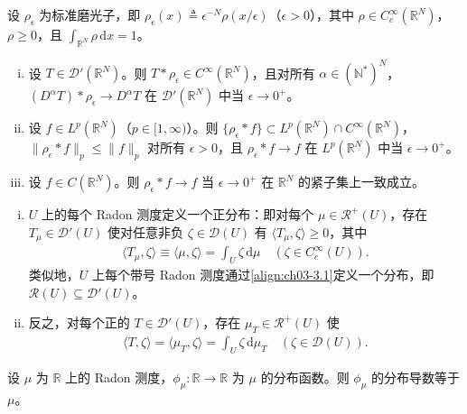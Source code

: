 \documentclass[../../main.tex]{subfiles}%
\begin{document}
设 $\rho_\epsilon$ 为标准磨光子，即 $\rho_\epsilon(x)\triangleq \epsilon^{-N}\rho(x/\epsilon)$（$\epsilon>0$），其中 $\rho\in C^\infty_c(\mathbb{R}^N)$，$\rho\geqslant0$，且 $\int_{\mathbb{R}^N}\rho\,\mathrm{d}x=1$。

\begin{proposition}\label{proposition:ch03-磨光逼近}\label{proposition:ch03-磨光性质}
\begin{enumerate}[(i)]
\item 设 $T\in\mathcal{D}'(\mathbb{R}^N)$。则 $T*\rho_\epsilon\in C^\infty(\mathbb{R}^N)$，且对所有 $\alpha\in(\mathbb{N}^*)^N$，$(D^\alpha T)*\rho_\epsilon\to D^\alpha T$ 在 $\mathcal{D}'(\mathbb{R}^N)$ 中当 $\epsilon\to0^+$。
\item 设 $f\in L^p(\mathbb{R}^N)$（$p\in[1,\infty)$）。则 $\{\rho_\epsilon*f\}\subset L^p(\mathbb{R}^N)\cap C^\infty(\mathbb{R}^N)$，$\|\rho_\epsilon*f\|_p\leqslant\|f\|_p$ 对所有 $\epsilon>0$，且 $\rho_\epsilon*f\to f$ 在 $L^p(\mathbb{R}^N)$ 中当 $\epsilon\to0^+$。
\item 设 $f\in C(\mathbb{R}^N)$。则 $\rho_\epsilon*f\to f$ 当 $\epsilon\to0^+$ 在 $\mathbb{R}^N$ 的紧子集上一致成立。
\end{enumerate}
\end{proposition}

\begin{remark}\label{remark:ch03-Radon即分布}
\begin{enumerate}[(i)]
\item $U$ 上的每个 Radon 测度定义一个正分布：即对每个 $\mu\in\mathscr{R}^+(U)$，存在 $T_\mu\in\mathcal{D}'(U)$ 使对任意非负 $\zeta\in\mathcal{D}(U)$ 有 $\langle T_\mu,\zeta\rangle\geqslant0$，其中
\begin{align}
\langle T_\mu,\zeta\rangle\equiv\langle\mu,\zeta\rangle=\int_U\zeta\,\mathrm{d}\mu
\quad (\zeta\in C^\infty_c(U)).\label{align:ch03-3.1}
\end{align}
类似地，$U$ 上每个带号 Radon 测度通过\eqref{align:ch03-3.1}定义一个分布，即 $\mathscr{R}(U)\subseteq\mathcal{D}'(U)$。
\item 反之，对每个正的 $T\in\mathcal{D}'(U)$，存在 $\mu_T\in\mathscr{R}^+(U)$ 使
\begin{align*}
\langle T,\zeta\rangle=\langle\mu_T,\zeta\rangle=\int_U\zeta\,\mathrm{d}\mu_T
\quad (\zeta\in\mathcal{D}(U)).
\end{align*}
\end{enumerate}
\end{remark}

\begin{proposition}\label{proposition:ch03-分布函数导数}
设 $\mu$ 为 $\mathbb{R}$ 上的 Radon 测度，$\phi_\mu:\mathbb{R}\to\mathbb{R}$ 为 $\mu$ 的分布函数。则 $\phi_\mu$ 的分布导数等于 $\mu$。
\end{proposition}
\end{document}
